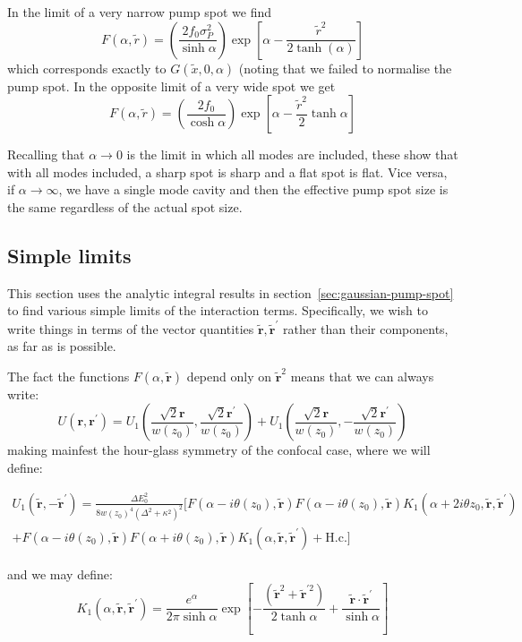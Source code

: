 \documentclass[twocolumn]{revtex4-1}
\renewcommand{\vec}[1]{\mathbf{#1}}
\newcommand{\tvr}{\tilde{\vec{r}}}
\newcommand{\tvrp}{\tilde{\vec{r}}^\prime}
\begin{document}
In the limit of a very narrow pump spot we find
\begin{equation}
  \label{eq:8}
  F(\alpha, \tilde{r}) =
  \left(\frac{2 f_0 \sigma_P^2 }{\sinh\alpha }\right)
  \exp\left[\alpha
    - \frac{\tilde{r}^2}{2 \tanh(\alpha)}
  \right]
\end{equation}
which corresponds exactly to $G(\tilde{x},0,\alpha)$ (noting that we
failed to normalise the pump spot. In the opposite limit of a
very wide spot we get
\begin{equation}
  \label{eq:9}
  F(\alpha, \tilde{r}) =
  \left(\frac{2 f_0}{\cosh\alpha}\right)
  \exp\left[\alpha
    - \frac{\tilde{r}^2}{2}\tanh\alpha
  \right]
\end{equation}

Recalling that $\alpha \to 0$ is the limit in which all modes are
included, these show that with all modes included, a sharp spot is
sharp and a flat spot is flat.  Vice versa, if $\alpha \to \infty$, we
have a single mode cavity and then the effective pump spot size is the
same regardless of the actual spot size.

\subsection{Simple limits}
\label{sec:simple-limits}

This section uses the analytic integral results in
section~\ref{sec:gaussian-pump-spot} to find various simple limits of
the interaction terms.  Specifically, we wish to write things in terms
of the vector quantities $\tvr, \tvrp$
rather than their components, as far as is possible.  

The fact the functions $F(\alpha,\tvr)$ depend only on 
$\tvr^2$ means that we can always write:
\begin{equation}
  \label{eq:10}
  U(\vec{r},\vec{r}^\prime) =
  U_1\left(\frac{\sqrt{2}\vec{r}}{w(z_0)},
    \frac{\sqrt{2}\vec{r}^\prime}{w(z_0)}\right) 
  +
  U_1\left(\frac{\sqrt{2}\vec{r}}{w(z_0)},
    -\frac{\sqrt{2}\vec{r}^\prime}{w(z_0)}\right) 
\end{equation}
making mainfest the hour-glass symmetry of the confocal case, where we
will define:
\begin{widetext}
\begin{multline}
  \label{eq:11}
  U_1(\tvr,-\tvrp) = 
  \frac{\Delta E_0^2}{8 w(z_0)^4 (\Delta^2+\kappa^2)^2} 
  \biggl[
    F(\alpha-i\theta(z_0), \tvr) F(\alpha-i\theta(z_0), \tvr) 
    K_1(\alpha+2i\theta z_0, \tvr, \tvrp) 
  \\+
    F(\alpha-i\theta(z_0), \tvr) F(\alpha+i\theta(z_0), \tvr) 
    K_1(\alpha, \tvr, \tvrp)
    +
    \text{H.c.}
  \biggr]
\end{multline}
\end{widetext}
 and we
may define:
\begin{equation}
  \label{eq:12}
  K_1(\alpha, \tvr, \tvrp)
  =
  \frac{e^\alpha}{2\pi \sinh\alpha}
  \exp\left[
    - \frac{(\tvr^2+\tvr^{\prime 2})}{2 \tanh\alpha}
    + \frac{\tvr\cdot\tvrp}{\sinh\alpha}
  \right]
\end{equation}
\end{document}
